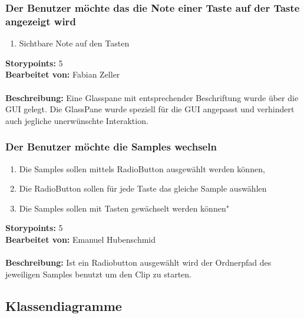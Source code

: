 \subsubsection{Der Benutzer möchte das die Note einer Taste auf der Taste angezeigt wird}

\begin{enumerate}
 \item Sichtbare Note auf den Tasten
\end{enumerate}

\textbf{Storypoints:} 5 \\
\textbf{Bearbeitet von:} Fabian Zeller \\
\\
\textbf{Beschreibung:} Eine Glasspane mit entsprechender Beschriftung wurde über die GUI gelegt. Die GlassPane wurde speziell für die GUI angepasst und verhindert auch jegliche unerwünschte Interaktion.


\subsubsection{Der Benutzer möchte die Samples wechseln}

\begin{enumerate}
 \item Die Samples sollen mittels RadioButton ausgewählt werden können,
 \item Die RadioButton sollen für jede Taste das gleiche Sample auswählen
 \item Die Samples sollen mit Tasten gewächselt werden können"
\end{enumerate}

\textbf{Storypoints:} 5 \\
\textbf{Bearbeitet von:} Emanuel Hubenschmid \\
\\
\textbf{Beschreibung:} Ist ein Radiobutton ausgewählt wird der Ordnerpfad 
des jeweiligen Samples benutzt um den Clip zu starten.


\newpage


\subsection{Klassendiagramme}

